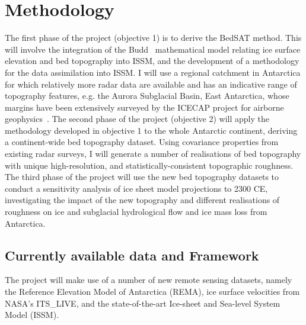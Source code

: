 \chapter{Methodology}

The first phase of the project (objective 1) is to derive the BedSAT method. This will involve the integration of the Budd~\cite{Budd_1970} mathematical model relating ice surface elevation and bed topography into ISSM, and the development of a methodology for the data assimilation into ISSM. I will use a regional catchment in Antarctica for which relatively more radar data are available and has an indicative range of topography features, e.g. the Aurora Subglacial Basin, East Antarctica, whose margins have been extensively surveyed by the ICECAP project for airborne geophysics~\cite{Young_2011}. The second phase of the project (objective 2) will apply the methodology developed in objective 1 to the whole Antarctic continent, deriving a continent-wide bed topography dataset. Using covariance properties from existing radar surveys, I will generate a number of realisations of bed topography with unique high-resolution, and statistically-consistent topographic roughness. The third phase of the project will use the new bed topography datasets to conduct a sensitivity analysis of ice sheet model projections to 2300 CE, investigating the impact of the new topography and different realisations of roughness on ice and subglacial hydrological flow and ice mass loss from Antarctica.\\


\section*{Currently available data and Framework}\label{data}
The project will make use of a number of new remote sensing datasets, namely the Reference Elevation Model of Antarctica (REMA), ice surface velocities from NASA’s ITS\_LIVE, and the state-of-the-art Ice-sheet and Sea-level System Model (ISSM).


